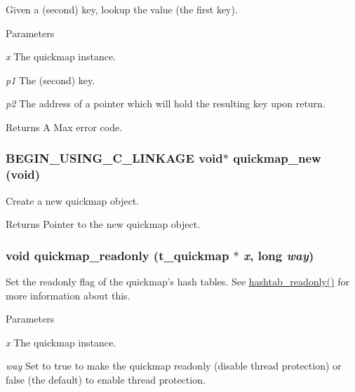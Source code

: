 Given a (second) key, lookup the value (the first key). 
\begin{DoxyParams}{Parameters}
\item[{\em x}]The quickmap instance. \item[{\em p1}]The (second) key. \item[{\em p2}]The address of a pointer which will hold the resulting key upon return. \end{DoxyParams}
\begin{DoxyReturn}{Returns}
A Max error code. 
\end{DoxyReturn}
\hypertarget{group__quickmap_ga0e14465f864438dc36f86dcd8bc4cea0}{
\subsubsection[{quickmap\_\-new}]{\setlength{\rightskip}{0pt plus 5cm}BEGIN\_\-USING\_\-C\_\-LINKAGE void$\ast$ quickmap\_\-new (void)}}
\label{group__quickmap_ga0e14465f864438dc36f86dcd8bc4cea0}


Create a new quickmap object. \begin{DoxyReturn}{Returns}
Pointer to the new quickmap object. 
\end{DoxyReturn}
\hypertarget{group__quickmap_gaa5c0fc50afb5b1dccd6b81e7dd0673c1}{
\subsubsection[{quickmap\_\-readonly}]{\setlength{\rightskip}{0pt plus 5cm}void quickmap\_\-readonly ({\bf t\_\-quickmap} $\ast$ {\em x}, \/  long {\em way})}}
\label{group__quickmap_gaa5c0fc50afb5b1dccd6b81e7dd0673c1}


Set the readonly flag of the quickmap's hash tables. See \hyperlink{group__hashtab_ga34ced5b4da65b4068829f799a53ea6bf}{hashtab\_\-readonly()} for more information about this.


\begin{DoxyParams}{Parameters}
\item[{\em x}]The quickmap instance. \item[{\em way}]Set to true to make the quickmap readonly (disable thread protection) or false (the default) to enable thread protection. \end{DoxyParams}
